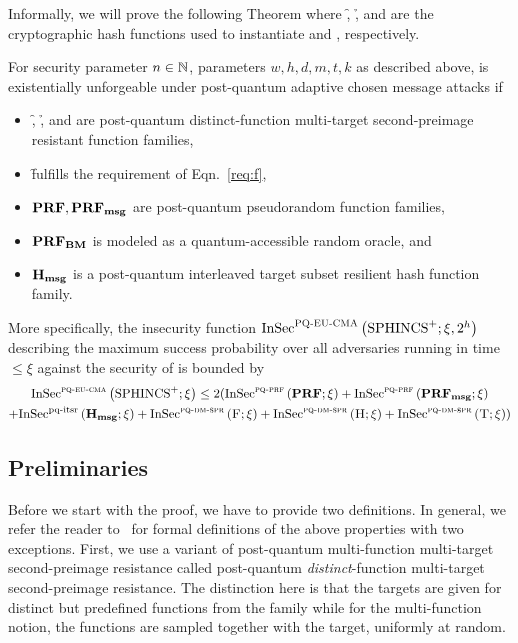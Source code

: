 Informally, we will prove the following Theorem where \f, \h, and \tfunc are the 
cryptographic hash functions used to instantiate \sphincsF and \sphincsH, \sphincsT respectively.

\begin{theorem}\label{thm:spx}
For security parameter $n \in \mathbb{N}$, parameters $w, h, d, m, t, k$ as described 
above, \spx is existentially unforgeable under post-quantum adaptive chosen 
message attacks if
\begin{itemize}
	\item \f, \h, and \tfunc are post-quantum distinct-function multi-target second-preimage resistant function families,
	\item \f fulfills the requirement of Eqn.~\ref{req:f}, 
	\item $\mathbf{PRF}, \mathbf{PRF_{msg}}$ are post-quantum pseudorandom function families, 
	\item $\mathbf{PRF_{BM}}$ is modeled as a quantum-accessible random oracle, and
	\item $\mathbf{H_{msg}}$ is a post-quantum interleaved target subset resilient hash function family.
\end{itemize} 
More specifically, the insecurity function
${\mathrm{InSec}}^{{\mathsf{\textsc{{PQ\text{-}EU\text{-}CMA}}}}}\left( {{\textrm{SPHINCS}^+}}; {\xi,2^h} \right) $ describing the maximum success
probability over all adversaries running in time $\leq
\xi$ against the \pqeucma security of \spx is bounded by
\begin{multline}\label{eqn:exactmin}
 {\mathrm{InSec}}^{{\mathsf{\textsc{{pq\text{-}eu\text{-}cma}}}}}\left( {{\textrm{SPHINCS}^+}}; {\xi} \right)  \leq 2({\mathrm{InSec}}^{{\mathsf{\textsc{pq-prf}}}}\left( {\mathbf{PRF}}; {\xi} \right) +{\mathrm{InSec}}^{{\mathsf{\textsc{pq-prf}}}}\left( {\mathbf{PRF_{msg}}}; {\xi} \right)  \\
 + {\mathrm{InSec}}^{{\text{pq-itsr}}}\left( {\mathbf{H_{msg}}}; {\xi} \right) + {\mathrm{InSec}}^{{\mathsf{\textsc{pq-dm-spr}}}}\left( {\textsc{F}}; {\xi} \right) + {\mathrm{InSec}}^{{\mathsf{\textsc{pq-dm-spr}}}}\left( {\textsc{H}}; {\xi} \right) + {\mathrm{InSec}}^{{\mathsf{\textsc{pq-dm-spr}}}}\left( {\textsc{T}}; {\xi} \right) )
 \end{multline}
\end{theorem}

\subsection{Preliminaries}
Before we start with the proof, we have to provide two definitions. In general, 
we refer the reader to~\cite{Huelsing2016} for formal definitions of the above 
properties with two exceptions. First, we use a variant of 
post-quantum multi-function multi-target second-preimage resistance called
post-quantum \emph{distinct}-function multi-target second-preimage resistance.
The distinction here is that the targets are given for distinct but 
predefined functions from the family while for the multi-function notion, 
the functions are sampled together with the target, uniformly at random.

